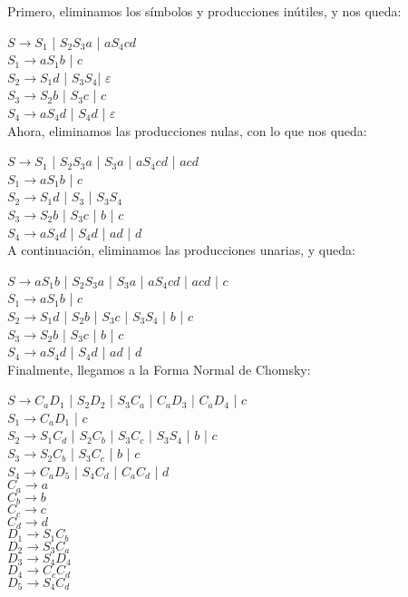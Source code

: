 \documentclass[a4paper, 11pt]{article}
\begin{document}
\begin{enumerate}
	Primero, eliminamos los símbolos y producciones inútiles, y nos queda:
	
	$S \rightarrow S_1$ | $S_2S_3a$ | $aS_4cd$\\
	$S_1 \rightarrow aS_1b$ | $c$\\
	$S_2 \rightarrow S_1d$ | $S_3S_4$| $\varepsilon$\\
	$S_3 \rightarrow S_2b$ | $S_3c$ | $c$\\
	$S_4 \rightarrow aS_4d$ | $S_4d$ | $\varepsilon$\\
	
	Ahora, eliminamos las producciones nulas, con lo que nos queda:
	
	$S \rightarrow S_1$ | $S_2S_3a$ | $S_3a$ | $aS_4cd$ | $acd$\\
	$S_1 \rightarrow aS_1b$ | $c$\\
	$S_2 \rightarrow S_1d$ | $S_3$ | $S_3S_4$\\
	$S_3 \rightarrow S_2b$ | $S_3c$  | $b$ | $c$\\
	$S_4 \rightarrow aS_4d$ | $S_4d$ | $ad$ | $d$\\
	
	A continuación, eliminamos las producciones unarias, y queda:
	
	$S \rightarrow aS_1b$ | $S_2S_3a$ | $S_3a$ | $aS_4cd$ | $acd$ | $c$\\
	$S_1 \rightarrow aS_1b$ | $c$\\
	$S_2 \rightarrow S_1d$ | $S_2b$ | $S_3c$ | $S_3S_4$ | $b$ | $c$\\
	$S_3 \rightarrow S_2b$ | $S_3c$  | $b$ | $c$\\
	$S_4 \rightarrow aS_4d$ | $S_4d$ | $ad$ | $d$\\
	
	Finalmente, llegamos a la Forma Normal de Chomsky:
	
	$S \rightarrow C_aD_1$ | $S_2D_2$ | $S_3C_a$ | $C_aD_3$ | $C_aD_4$ | $c$\\
	$S_1 \rightarrow C_aD_1$ | $c$\\
	$S_2 \rightarrow S_1C_d$ | $S_2C_b$ | $S_3C_c$ | $S_3S_4$ | $b$ | $c$\\
	$S_3 \rightarrow S_2C_b$ | $S_3C_c$  | $b$ | $c$\\
	$S_4 \rightarrow C_aD_5$ | $S_4C_d$ | $C_aC_d$ | $d$\\
	$C_a \rightarrow a$\\
	$C_b \rightarrow b$\\
	$C_c \rightarrow c$\\
	$C_d \rightarrow d$\\
	$D_1 \rightarrow S_1C_b$\\
	$D_2 \rightarrow S_3C_a$\\
	$D_3 \rightarrow S_4D_4$\\
	$D_4 \rightarrow C_cC_d$\\
	$D_5 \rightarrow S_4C_d$\\
	
\end{enumerate}
\end{document}
